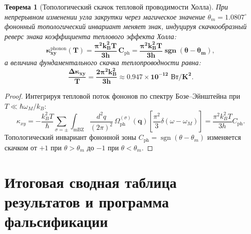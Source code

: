 \documentclass[12pt,a4paper]{article}
\newtheorem{theorem}{Теорема}
\begin{document}
\begin{theorem}[Топологический скачок тепловой проводимости Холла]
	При непрерывном изменении угла закрутки через магическое значение $\theta_m = 1.0807^\circ$ фононный топологический инвариант меняет знак, индуцируя скачкообразный реверс знака коэффициента теплового эффекта Холла:
	\begin{equation}
		\mathbf{\kappa_{xy}^{\mathrm{phonon}}(T) = \frac{\pi^2 k_B^2 T}{3 h} \, C_{\mathrm{ph}} = \frac{\pi^2 k_B^2 T}{3 h} \operatorname{sgn}(\theta - \theta_m)},
	\end{equation}
	а величина фундаментального скачка теплопроводности равна:
	\begin{equation}
		\mathbf{\frac{\Delta \kappa_{xy}}{T} = \frac{2\pi^2 k_B^2}{3 h} \approx \mathbf{0.947 \times 10^{-12}\text{ Вт}/\text{K}^2}}.
	\end{equation}
\end{theorem}

\begin{proof}
	Интегрируя тепловой поток фононов по спектру Бозе--Эйнштейна при $T \ll \hbar \omega_M / k_B$:
	\begin{equation}
		\kappa_{xy} = -\frac{k_B^2 T}{\hbar} \sum_{\sigma=\pm} \int_{\text{mBZ}} \frac{d^2q}{(2\pi)^2} \, \Omega_{\text{ph}}^{(\sigma)}(\mathbf{q}) \left[ \frac{\pi^2}{3} \delta(\omega - \omega_M) \right] = \frac{\pi^2 k_B^2 T}{3 h} C_{\text{ph}}.
	\end{equation}
	Топологический инвариант фононной зоны $C_{\text{ph}} = \operatorname{sgn}(\theta - \theta_m)$ изменяется скачком от $+1$ при $\theta > \theta_m$ до $-1$ при $\theta < \theta_m$.
\end{proof}

\section{Итоговая сводная таблица результатов и программа фальсификации}
\end{document}
